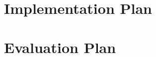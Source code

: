 \documentclass[12pt]{article}
\numberwithin{equation}{section}
\begin{document}

\newpage
\thispagestyle{plain}
\mbox{}
\section {Implementation Plan}
\label{sec:implementationPlan}


\newpage
\thispagestyle{plain}
\mbox{}
\section {Evaluation Plan}
\label{sec:evaluationPlan}


\newpage
\thispagestyle{plain}
\mbox{}



\end{document}

